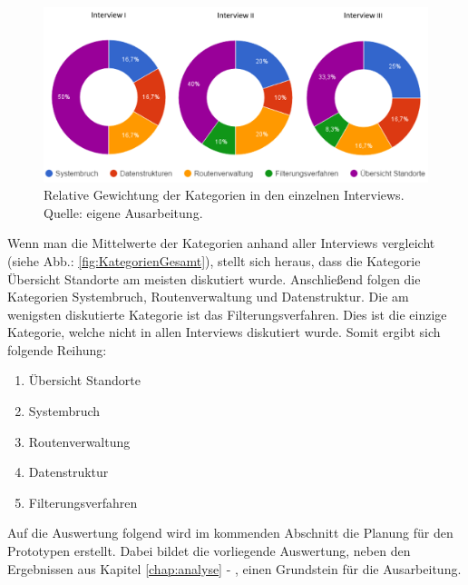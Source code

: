 \documentclass[Bachelorarbeit.tex]{subfiles}
\begin{document}
\begin{figure}[H]
	\centering
	\includegraphics[width=0.9\linewidth]{img/Interviews/VerteilungNachInterview}
	\caption[Relative Gewichtung der Kategorien in den einzelnen Interviews]{Relative Gewichtung der Kategorien in den einzelnen Interviews. Quelle: eigene Ausarbeitung.}
	\label{fig:GewichtungNachInterview}
\end{figure}

Wenn man die Mittelwerte der Kategorien anhand aller Interviews vergleicht (siehe Abb.: \ref{fig:KategorienGesamt}), stellt sich heraus, dass die Kategorie Übersicht Standorte am meisten diskutiert wurde. 
Anschließend folgen die Kategorien Systembruch, Routenverwaltung und Datenstruktur.
Die am wenigsten diskutierte Kategorie ist das Filterungsverfahren. 
Dies ist die einzige Kategorie, welche nicht in allen Interviews diskutiert wurde.
Somit ergibt sich folgende Reihung:

\begin{enumerate}
	\item Übersicht Standorte
	\item Systembruch
	\item Routenverwaltung
	\item Datenstruktur
	\item Filterungsverfahren
\end{enumerate}

Auf die Auswertung folgend wird im kommenden Abschnitt  die Planung für den Prototypen erstellt.
Dabei bildet die vorliegende Auswertung, neben den Ergebnissen aus Kapitel \ref{chap:analyse} - , einen Grundstein für die Ausarbeitung.

\newpage
\end{document}
